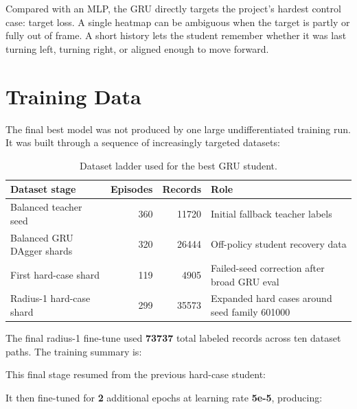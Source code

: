 \documentclass[11pt]{article}
\begin{document}
Compared with an MLP, the GRU directly targets the project's hardest control
case: target loss. A single heatmap can be ambiguous when the target is partly
or fully out of frame. A short history lets the student remember whether it was
last turning left, turning right, or aligned enough to move forward.

\section{Training Data}

The final best model was not produced by one large undifferentiated training
run. It was built through a sequence of increasingly targeted datasets:

\begin{table}[htbp]
\centering
\caption{Dataset ladder used for the best GRU student.}
\begin{tabular}{lrrl}
\toprule
\textbf{Dataset stage} & \textbf{Episodes} & \textbf{Records} & \textbf{Role} \\
\midrule
Balanced teacher seed & 360 & 11720 & Initial fallback teacher labels \\
Balanced GRU DAgger shards & 320 & 26444 & Off-policy student recovery data \\
First hard-case shard & 119 & 4905 & Failed-seed correction after broad GRU eval \\
Radius-1 hard-case shard & 299 & 35573 & Expanded hard cases around seed family 601000 \\
\bottomrule
\end{tabular}
\label{tab:data}
\end{table}

The final radius-1 fine-tune used \textbf{73737} total labeled records across
ten dataset paths. The training summary is:

\begin{center}
\end{center}

This final stage resumed from the previous hard-case student:

\begin{center}
\end{center}

It then fine-tuned for \textbf{2} additional epochs at learning rate
\textbf{5e-5}, producing:
\end{document}
